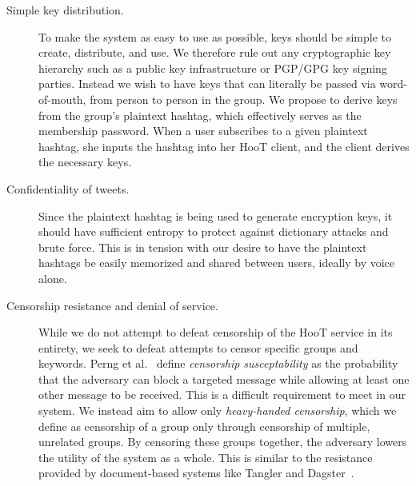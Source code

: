 \begin{description}

\item[Simple key distribution.] To make the system as easy to use as
  possible, keys should be simple to create, distribute, and use. We
  therefore rule out any cryptographic key hierarchy such as a public
  key infrastructure or PGP/GPG key signing parties. Instead we wish
  to have keys that can literally be passed via
  word-of-mouth, from person to person in the group. We propose
  to derive keys from the group's plaintext hashtag, which effectively
  serves as the membership password. When a user subscribes to a given plaintext
  hashtag, she inputs the hashtag into her HooT client, and the client
  derives the necessary keys.

\item[Confidentiality of tweets.] Since the plaintext hashtag is being
  used to generate encryption keys, it should have sufficient entropy to
  protect against dictionary attacks and brute force. This is in tension
  with our desire to have the plaintext hashtags be easily memorized and
  shared between users, ideally by voice alone.

\item[Censorship resistance and denial of service.] While we do not attempt
  to defeat censorship of the HooT service in its entirety, we seek to
  defeat attempts to censor specific groups and keywords. Perng et
  al.~\cite{perng05revisited} define {\em censorship susceptability} as the probability that the
  adversary can block a targeted message while allowing at least one
  other message to be received. This is a
  difficult requirement to meet in our system. We instead aim to allow
  only {\em heavy-handed censorship}, which we define as censorship of a
  group only through censorship of multiple, unrelated groups. By
  censoring these groups together, the adversary lowers the utility of
  the system as a whole. This is similar to the resistance provided by
  document-based systems like Tangler and Dagster~\cite{tangler,dagster}.


\end{description}
